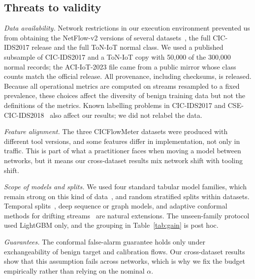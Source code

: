 \subsection{Threats to validity}\label{sec:threats}
\emph{Data availability.} Network restrictions in our execution environment prevented us from obtaining the NetFlow-v2 versions of several datasets~\cite{sarhan2022standard}, the full CIC-IDS2017 release and the full ToN-IoT normal class. We used a published subsample of CIC-IDS2017 and a ToN-IoT copy with 50{,}000 of the 300{,}000 normal records; the ACI-IoT-2023 file came from a public mirror whose class counts match the official release. All provenance, including checksums, is released. Because all operational metrics are computed on streams resampled to a fixed prevalence, these choices affect the diversity of benign training data but not the definitions of the metrics. Known labelling problems in CIC-IDS2017 and CSE-CIC-IDS2018~\cite{engelen2021troubleshooting,lanvin2023errors,flood2024bad} also affect our results; we did not relabel the data.

\emph{Feature alignment.} The three CICFlowMeter datasets were produced with different tool versions, and some features differ in implementation, not only in traffic. This is part of what a practitioner faces when moving a model between networks, but it means our cross-dataset results mix network shift with tooling shift.

\emph{Scope of models and splits.} We used four standard tabular model families, which remain strong on this kind of data~\cite{grinsztajn2022tree}, and random stratified splits within datasets. Temporal splits~\cite{pendlebury2019tesseract,luay2025temporal}, deep sequence or graph models, and adaptive conformal methods for drifting streams~\cite{gibbs2021adaptive,barber2023conformal} are natural extensions. The unseen-family protocol used LightGBM only, and the grouping in Table~\ref{tab:gain} is post hoc.

\emph{Guarantees.} The conformal false-alarm guarantee holds only under exchangeability of benign target and calibration flows. Our cross-dataset results show that this assumption fails across networks, which is why we fix the budget empirically rather than relying on the nominal $\alpha$.
